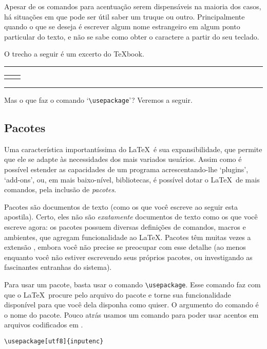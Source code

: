Apesar de os comandos para acentuação serem dispensáveis na maioria
dos casos, há situações em que pode ser útil saber um truque ou
outro. Principalmente quando o que se deseja é escrever algum nome
estrangeiro em algum ponto particular do texto, e não se sabe como
obter o caractere a partir do seu teclado.

O trecho a seguir é um excerto do \TeX book.

\medskip
\begin{center}\hrule\smallskip
\begin{tabular}{c|c}
\begin{minipage}{.405\textwidth}\footnotesize

\end{minipage} &
\begin{minipage}{.535\textwidth}

\end{minipage}
\end{tabular}
\smallskip\hrule
\end{center}
\medskip


Mas o que faz o comando `\verb'\usepackage''? Veremos a seguir.

\subsection{Pacotes}

Uma característica importantíssima do \LaTeX\  é sua
expansibilidade, que permite que ele se adapte às necessidades
dos mais variados usuários. Assim como é possível estender as
capacidades de um programa acrescentando-lhe `plugins', `add-ons', ou,
em mais baixo-nível, bibliotecas, é possível dotar o \LaTeX\ de mais
comandos, pela inclusão de \emph{pacotes}.

Pacotes são documentos de texto (como os que você escreve ao seguir
esta apostila). Certo, eles não são \emph{exatamente} documentos de
texto como os que você escreve agora: os pacotes possuem diversas
definições de comandos, macros e ambientes, que agregam funcionalidade
ao \LaTeX. Pacotes têm muitas vezes a extensão , embora
você não precise se preocupar com esse detalhe (ao menos enquanto você
não estiver escrevendo seus próprios pacotes, ou investigando as
fascinantes entranhas do sistema).

Para usar um pacote, basta usar o comando \verb'\usepackage'. Esse
comando faz com que o \LaTeX\ procure pelo arquivo do pacote e torne
sua funcionalidade disponível para que você dela disponha como quiser.
O argumento do comando é o nome do pacote. Pouco atrás usamos um
comando para poder usar acentos em arquivos codificados em .
\begin{center}\footnotesize
\begin{verbatim}
\usepackage[utf8]{inputenc}
\end{verbatim}
\end{center}

